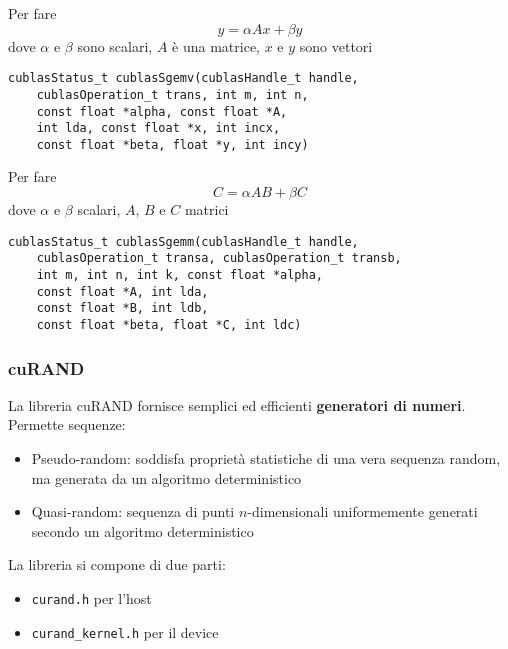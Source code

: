 Per fare 
$$ y = \alpha Ax + \beta y$$
dove $\alpha$ e $\beta$ sono scalari, $A$ è una matrice, $x$ e $y$ sono vettori
\begin{verbatim}
cublasStatus_t cublasSgemv(cublasHandle_t handle, 
    cublasOperation_t trans, int m, int n, 
    const float *alpha, const float *A, 
    int lda, const float *x, int incx, 
    const float *beta, float *y, int incy)
\end{verbatim}

Per fare
$$ C = \alpha AB + \beta C$$
dove $\alpha$ e $\beta$ scalari, $A$, $B$ e $C$ matrici
\begin{verbatim}
cublasStatus_t cublasSgemm(cublasHandle_t handle,
    cublasOperation_t transa, cublasOperation_t transb,
    int m, int n, int k, const float *alpha,
    const float *A, int lda,
    const float *B, int ldb,
    const float *beta, float *C, int ldc)
\end{verbatim}

\subsubsection{cuRAND}

La libreria cuRAND fornisce semplici ed efficienti \textbf{generatori di numeri}. Permette sequenze: 
\begin{itemize}
	\item Pseudo-random: soddisfa proprietà statistiche di una vera sequenza random, ma generata da un algoritmo deterministico
	
	\item Quasi-random: sequenza di punti $n$-dimensionali uniformemente generati secondo un algoritmo deterministico
\end{itemize}

La libreria si compone di due parti:
\begin{itemize}
	\item \texttt{curand.h} per l'host
	
	\item \texttt{curand\_kernel.h} per il device
\end{itemize}

